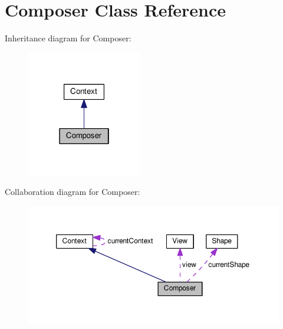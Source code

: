 \hypertarget{classComposer}{}\section{Composer Class Reference}
\label{classComposer}


Inheritance diagram for Composer\+:
\nopagebreak
\begin{figure}[H]
\begin{center}
\leavevmode
\includegraphics[width=142pt]{classComposer__inherit__graph}
\end{center}
\end{figure}


Collaboration diagram for Composer\+:
\nopagebreak
\begin{figure}[H]
\begin{center}
\leavevmode
\includegraphics[width=350pt]{classComposer__coll__graph}
\end{center}
\end{figure}
